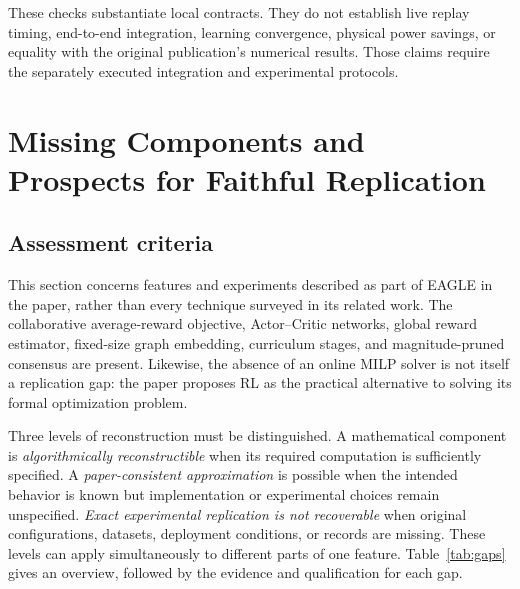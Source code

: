 \documentclass[11pt,a4paper]{article}
\begin{document}
These checks substantiate local contracts. They do not establish live replay
timing, end-to-end integration, learning convergence, physical power savings,
or equality with the original publication's numerical results. Those claims
require the separately executed integration and experimental protocols.

\clearpage
\section{Missing Components and Prospects for Faithful Replication}
\label{sec:missing}

\subsection{Assessment criteria}

This section concerns features and experiments described as part of EAGLE in
the paper, rather than every technique surveyed in its related work. The
collaborative average-reward objective, Actor--Critic networks, global reward
estimator, fixed-size graph embedding, curriculum stages, and magnitude-pruned
consensus are present. Likewise, the absence of an online MILP solver is not
itself a replication gap: the paper proposes RL as the practical alternative
to solving its formal optimization problem.

Three levels of reconstruction must be distinguished. A mathematical component
is \emph{algorithmically reconstructible} when its required computation is
sufficiently specified. A \emph{paper-consistent approximation} is possible
when the intended behavior is known but implementation or experimental choices
remain unspecified. \emph{Exact experimental replication is not recoverable}
when original configurations, datasets, deployment conditions, or records are
missing. These levels can apply simultaneously to different parts of one
feature. Table~\ref{tab:gaps} gives an overview, followed by the evidence and
qualification for each gap.
\end{document}
